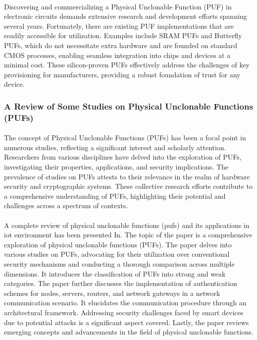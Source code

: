 \paragraph*{}
Discovering and commercializing a Physical Unclonable Function (PUF) in electronic circuits demands extensive research and development efforts spanning several years. Fortunately, there are existing PUF implementations that are readily accessible for utilization. Examples include SRAM PUFs and Butterfly PUFs, which do not necessitate extra hardware and are founded on standard CMOS processes, enabling seamless integration into chips and devices at a minimal cost. These silicon-proven PUFs effectively address the challenges of key provisioning for manufacturers, providing a robust foundation of trust for any device.
\subsubsection{A Review of Some Studies on Physical Unclonable Functions (PUFs)}
\paragraph*{}
The concept of Physical Unclonable Functions (PUFs) has been a focal point in numerous studies, reflecting a significant interest and scholarly attention. Researchers from various disciplines have delved into the exploration of PUFs, investigating their properties, applications, and security implications. The prevalence of studies on PUFs attests to their relevance in the realm of hardware security and cryptographic systems. These collective research efforts contribute to a comprehensive understanding of PUFs, highlighting their potential and challenges across a spectrum of contexts.
\paragraph*{}
 A complete review of physical unclonable functions (pufs) and its applications in iot environment has been presented In\cite{yadav2022review}. The topic of the paper is a comprehensive exploration of physical unclonable functions (PUFs). The paper delves into various studies on PUFs, advocating for their utilization over conventional security mechanisms and conducting a thorough comparison across multiple dimensions. It introduces the classification of PUFs into strong and weak categories. The paper further discusses the implementation of authentication schemes for nodes, servers, routers, and network gateways in a network communication scenario. It elucidates the communication procedure through an architectural framework. Addressing security challenges faced by smart devices due to potential attacks is a significant aspect covered. Lastly, the paper reviews emerging concepts and advancements in the field of physical unclonable functions.
